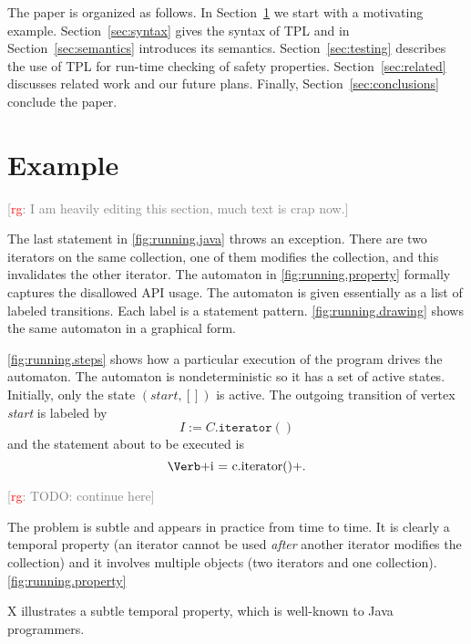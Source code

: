 \documentclass[preprint]{sigplanconf} %
\newcommand{\note}[2]{\textcolor{gray}{[\textcolor{red}{#1}: #2]}}
\newcommand{\rg}[1]{\note{rg}{#1}}
\theoremstyle{definition}
\begin{document}

The paper is organized as follows. In Section~\ref{sec:example} we start with a motivating example. 
Section~\ref{sec:syntax} gives the syntax of TPL and in Section~\ref{sec:semantics} introduces its semantics. 
Section~\ref{sec:testing} describes the use of TPL for run-time checking of safety properties. 
Section~\ref{sec:related} discusses related work and our future plans. 
Finally, Section~\ref{sec:conclusions} conclude the paper.
\section{Example}\label{sec:example} %

\rg{I am heavily editing this section, much text is crap now.}

The last statement in \autoref{fig:running.java} throws an exception.
There are two iterators on the same collection, one of them modifies the collection, and this invalidates the other iterator.
The automaton in \autoref{fig:running.property} formally captures the disallowed API usage.
The automaton is given essentially as a list of labeled transitions.
Each label is a statement pattern.
\autoref{fig:running.drawing} shows the same automaton in a graphical form.

\autoref{fig:running.steps} shows how a particular execution of the program drives the automaton.
The automaton is nondeterministic so it has a set of active states.
Initially, only the state $(\mathit{start},[])$ is active.
The outgoing transition of vertex \textit{start} is labeled by \[I:=C.\mathtt{iterator}()\] and the statement about to be executed is \[\text{\Verb+i = c.iterator()+}.\]

\rg{TODO: continue here}


The problem is subtle and appears in practice from time to time.
It is clearly a temporal property (an iterator cannot be used \emph{after} another iterator modifies the collection) and it involves multiple objects (two iterators and one collection).
\autoref{fig:running.property} 



X illustrates a subtle temporal property, which is well-known to Java programmers.
\end{document}
